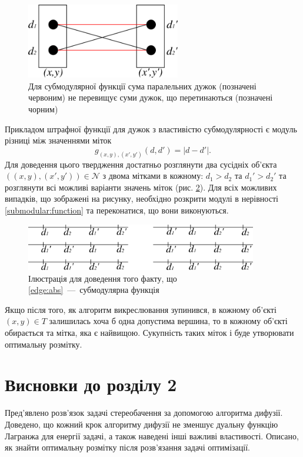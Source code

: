 \begin{figure}[h]
  \centering
  \includegraphics[width=0.6\textwidth]{images/submodular_function}
  \caption{Для субмодулярної функції сума паралельних дужок (позначені червоним)
           не перевищує суми дужок, що перетинаються (позначені чорним)}
  \label{fig:submodular:function}
\end{figure}

Прикладом штрафної функції для дужок з властивістю субмодулярності
є модуль різниці між значеннями міток
\begin{equation} \label{edge:abs}
    g_{\left(x, y \right), \left(x', y' \right)} \left( d, d' \right)
    = \left| d - d' \right|.
\end{equation}
Для доведення цього твердження достатньо розглянути два сусідніх об'єкта
$\left(\left(x, y \right), \left(x', y' \right) \right) \in \mathcal{N}$
з двома мітками в кожному: $d_1 > d_2$ та $d_1' > d_2'$
та розглянути всі можливі варіанти значень міток
(рис. \ref{fig:submodularity:abs:proof}).
Для всіх можливих випадків, що зображені на рисунку,
необхідно розкрити модулі в нерівності \eqref{submodular:function}
та переконатися, що вони виконуються.

\begin{figure}[h]
  \centering
  \includegraphics[width=0.9\textwidth]{images/submodularity_abs_proof}
  \caption{Ілюстрація для доведення того факту,
           що \eqref{edge:abs}~---~субмодулярна функція}
  \label{fig:submodularity:abs:proof}
\end{figure}

Якщо після того, як алгоритм викреслювання зупинився,
в кожному об'єкті $\left(x, y \right) \in T$
залишилась хоча б одна допустима вершина,
то в кожному об'єкті обирається та мітка, яка є найвищою.
Сукупність таких міток і буде утворювати оптимальну розмітку.

\section*{Висновки до розділу 2}

Пред'явлено розв'язок задачі стереобачення за допомогою алгоритма дифузії.
Доведено, що кожний крок алгоритму дифузії не зменшує дуальну функцію Лагранжа
для енергії задачі, а також наведені інші важливі властивості.
Описано, як знайти оптимальну розмітку після розв'язання задачі оптимізації.
